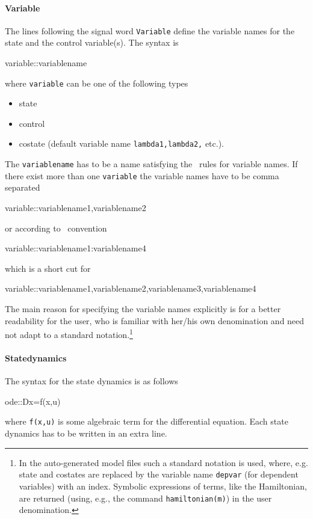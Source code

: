 \paragraph{Variable}
\label{sec:Variable}
The lines following the signal word \lstinline+Variable+ define the variable names for the state and the control variable(s). The syntax is 
\begin{ocmlisting}
variable::variablename
\end{ocmlisting}
where \lstinline+variable+ can be one of the following types
\begin{itemize}
	\item state
	\item control
	\item costate (default variable name \lstinline+lambda1,lambda2,+ etc.).
\end{itemize}
The \lstinline+variablename+ has to be a name satisfying the \MATL\ rules for variable names. If there exist more than one \lstinline+variable+ the variable names have to be comma separated
\begin{ocmlisting}
variable::variablename1,variablename2
\end{ocmlisting}
or according to \MATL\ convention
\begin{ocmlisting}
variable::variablename1:variablename4
\end{ocmlisting}
which is a short cut for
\begin{ocmlisting}
variable::variablename1,variablename2,variablename3,variablename4
\end{ocmlisting}
The main reason for specifying the variable names explicitly is for a better readability for the user, who is familiar with her/his own denomination and need not adapt to a standard notation.\footnote{In the auto-generated model files such a standard notation is used, where, e.g. state and costates are replaced by the variable name \lstinline+depvar+ (for dependent variables) with an index. Symbolic expressions of terms, like the Hamiltonian, are returned (using, e.g., the command \lstinline+hamiltonian(m)+) in the user denomination.}

\paragraph{Statedynamics}
\label{sec:Statedynamics}
The syntax for the state dynamics is as follows
\begin{ocmlisting}
ode::Dx=f(x,u)
\end{ocmlisting}
where \lstinline+f(x,u)+ is some algebraic term for the differential equation.
Each state dynamics has to be written in an extra line.

